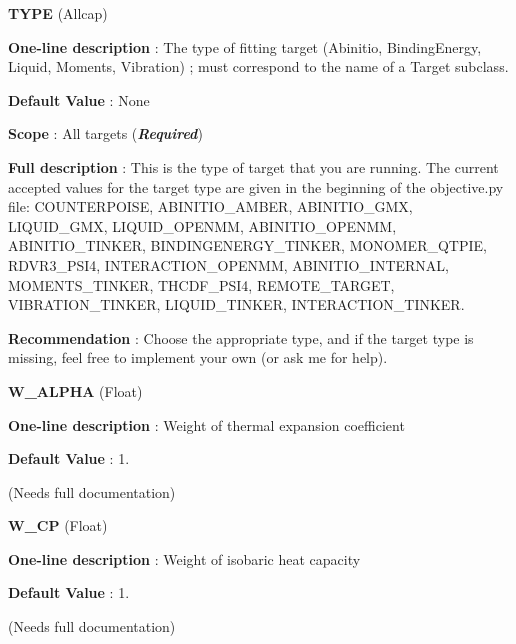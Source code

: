 \begin{DoxyItemize}
\item {\bfseries  \-T\-Y\-P\-E } (\-Allcap) \par
{\bfseries  \-One-\/line description }\-: \-The type of fitting target (\-Abinitio, \-Binding\-Energy, \-Liquid, \-Moments, \-Vibration) ; must correspond to the name of a \-Target subclass. \par
{\bfseries  \-Default \-Value }\-: \-None \par
{\bfseries  \-Scope }\-: \-All targets ({\bfseries {\itshape \-Required\/}}) \par
{\bfseries  \-Full description }\-: \-This is the type of target that you are running. \-The current accepted values for the target type are given in the beginning of the objective.\-py file\-: \-C\-O\-U\-N\-T\-E\-R\-P\-O\-I\-S\-E, \-A\-B\-I\-N\-I\-T\-I\-O\-\_\-\-A\-M\-B\-E\-R, \-A\-B\-I\-N\-I\-T\-I\-O\-\_\-\-G\-M\-X, \-L\-I\-Q\-U\-I\-D\-\_\-\-G\-M\-X, \-L\-I\-Q\-U\-I\-D\-\_\-\-O\-P\-E\-N\-M\-M, \-A\-B\-I\-N\-I\-T\-I\-O\-\_\-\-O\-P\-E\-N\-M\-M, \-A\-B\-I\-N\-I\-T\-I\-O\-\_\-\-T\-I\-N\-K\-E\-R, \-B\-I\-N\-D\-I\-N\-G\-E\-N\-E\-R\-G\-Y\-\_\-\-T\-I\-N\-K\-E\-R, \-M\-O\-N\-O\-M\-E\-R\-\_\-\-Q\-T\-P\-I\-E, \-R\-D\-V\-R3\-\_\-\-P\-S\-I4, \-I\-N\-T\-E\-R\-A\-C\-T\-I\-O\-N\-\_\-\-O\-P\-E\-N\-M\-M, \-A\-B\-I\-N\-I\-T\-I\-O\-\_\-\-I\-N\-T\-E\-R\-N\-A\-L, \-M\-O\-M\-E\-N\-T\-S\-\_\-\-T\-I\-N\-K\-E\-R, \-T\-H\-C\-D\-F\-\_\-\-P\-S\-I4, \-R\-E\-M\-O\-T\-E\-\_\-\-T\-A\-R\-G\-E\-T, \-V\-I\-B\-R\-A\-T\-I\-O\-N\-\_\-\-T\-I\-N\-K\-E\-R, \-L\-I\-Q\-U\-I\-D\-\_\-\-T\-I\-N\-K\-E\-R, \-I\-N\-T\-E\-R\-A\-C\-T\-I\-O\-N\-\_\-\-T\-I\-N\-K\-E\-R. \par
{\bfseries  \-Recommendation }\-: \-Choose the appropriate type, and if the target type is missing, feel free to implement your own (or ask me for help).\end{DoxyItemize}
\begin{DoxyItemize}
\item {\bfseries  \-W\-\_\-\-A\-L\-P\-H\-A } (\-Float) \par
{\bfseries  \-One-\/line description }\-: \-Weight of thermal expansion coefficient \par
{\bfseries  \-Default \-Value }\-: 1. \par
(\-Needs full documentation)\end{DoxyItemize}
\begin{DoxyItemize}
\item {\bfseries  \-W\-\_\-\-C\-P } (\-Float) \par
{\bfseries  \-One-\/line description }\-: \-Weight of isobaric heat capacity \par
{\bfseries  \-Default \-Value }\-: 1. \par
(\-Needs full documentation)\end{DoxyItemize}
